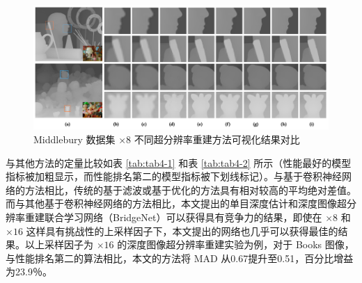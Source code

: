 \begin{figure}[!htbp]
	\centering
	\includegraphics{figures/29.png}
	\caption{Middlebury 数据集 $\times 8$ 不同超分辨率重建方法可视化结果对比}
	\label{fig:fig4-3}
	\vspace{-0.8cm}  %
	\end{figure}
	
	与其他方法的定量比较如表 \ref{tab:tab4-1} 和表 \ref{tab:tab4-2} 所示（性能最好的模型指标被加粗显示，而性能排名第二的模型指标被下划线标记）。与基于卷积神经网络的方法相比，传统的基于滤波或基于优化的方法具有相对较高的平均绝对差值。而与其他基于卷积神经网络的方法相比，本文提出的单目深度估计和深度图像超分辨率重建联合学习网络（BridgeNet）可以获得具有竞争力的结果，即使在 $\times 8$ 和 $\times 16$ 这样具有挑战性的上采样因子下，本文提出的网络也几乎可以获得最佳的结果。以上采样因子为 $\times 16$ 的深度图像超分辨率重建实验为例，对于 Books 图像，与性能排名第二的算法相比，本文的方法将 MAD 从0.67提升至0.51，百分比增益为23.9％。
	
